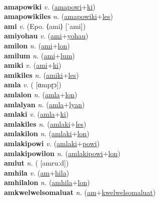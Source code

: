  \label{amapowinyolum} \\
\textbf{amapowiki} \textit{v.} (\hyperref[amapowi]{amapowi}+\hyperref[ki]{ki})
 \label{amapowiki} \\
\textbf{amapowikiles} \textit{n.} (\hyperref[amapowiki]{amapowiki}+\hyperref[les]{les})
 \label{amapowikiles} \\
\textbf{ami} \textit{v.} (Epo. ⟨ami⟩ [ˈami])
 \label{ami} \\
\textbf{amiyohau} \textit{v.} (\hyperref[ami]{ami}+\hyperref[yohau]{yohau})
 \label{amiyohau} \\
\textbf{amilon} \textit{n.} (\hyperref[ami]{ami}+\hyperref[lon]{lon})
 \label{amilon} \\
\textbf{amilum} \textit{n.} (\hyperref[ami]{ami}+\hyperref[lum]{lum})
 \label{amilum} \\
\textbf{amiki} \textit{v.} (\hyperref[ami]{ami}+\hyperref[ki]{ki})
 \label{amiki} \\
\textbf{amikiles} \textit{n.} (\hyperref[amiki]{amiki}+\hyperref[les]{les})
 \label{amikiles} \\
\textbf{amla} \textit{v.} ( [ɑmpɽɔ])
 \label{amla} \\
\textbf{amlalon} \textit{n.} (\hyperref[amla]{amla}+\hyperref[lon]{lon})
 \label{amlalon} \\
\textbf{amlalyan} \textit{n.} (\hyperref[amla]{amla}+\hyperref[lyan]{lyan})
 \label{amlalyan} \\
\textbf{amlaki} \textit{v.} (\hyperref[amla]{amla}+\hyperref[ki]{ki})
 \label{amlaki} \\
\textbf{amlakiles} \textit{n.} (\hyperref[amlaki]{amlaki}+\hyperref[les]{les})
 \label{amlakiles} \\
\textbf{amlakilon} \textit{n.} (\hyperref[amlaki]{amlaki}+\hyperref[lon]{lon})
 \label{amlakilon} \\
\textbf{amlakipowi} \textit{v.} (\hyperref[amlaki]{amlaki}+\hyperref[powi]{powi})
 \label{amlakipowi} \\
\textbf{amlakipowilon} \textit{n.} (\hyperref[amlakipowi]{amlakipowi}+\hyperref[lon]{lon})
 \label{amlakipowilon} \\
\textbf{amlut} \textit{n.} ( [amruːd])
 \label{amlut} \\
\textbf{amhila} \textit{v.} (\hyperref[am]{am}+\hyperref[hila]{hila})
 \label{amhila} \\
\textbf{amhilalon} \textit{n.} (\hyperref[amhila]{amhila}+\hyperref[lon]{lon})
 \label{amhilalon} \\
\textbf{amkwelwelsomaluat} \textit{n.} (\hyperref[am]{am}+\hyperref[kwelwelsomaluat]{kwelwelsomaluat})
